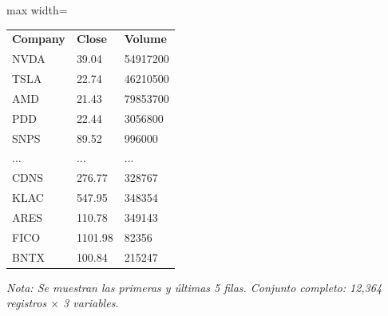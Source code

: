 

\begin{table}[htbp]

\centering

\begin{adjustbox}{max width=\textwidth}

\begin{tabular}{lll}

\rowcolor{ThemeBackground}
\rule{0pt}{0.45cm}
\textcolor{ThemeGold}{\bfseries Company} & \textcolor{ThemeGold}{\bfseries Close} & \textcolor{ThemeGold}{\bfseries Volume} \\

NVDA & 39.04 & 54917200 \\
TSLA & 22.74 & 46210500 \\
AMD & 21.43 & 79853700 \\
PDD & 22.44 & 3056800 \\
SNPS & 89.52 & 996000 \\
... & ... & ... \\
CDNS & 276.77 & 328767 \\
KLAC & 547.95 & 348354 \\
ARES & 110.78 & 349143 \\
FICO & 1101.98 & 82356 \\
BNTX & 100.84 & 215247 \\
\bottomrule
\end{tabular}

\end{adjustbox}

\vspace{0.15cm}
{\raggedright\sffamily\footnotesize\color{ThemeMuted}
\textit{Nota: Se muestran las primeras y últimas 5 filas. Conjunto completo: 12,364 registros $\times$ 3 variables.}}

\end{table}

